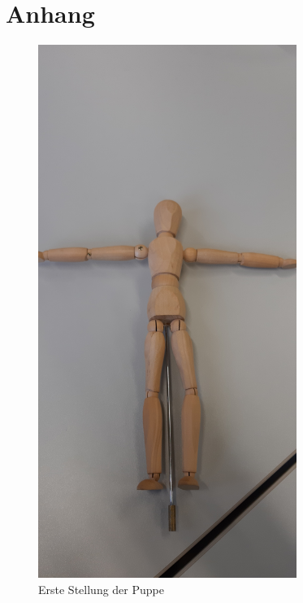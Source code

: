 \section{Anhang}
\label{sec:Anhang}

\begin{figure}
    \centering
    \includegraphics[width=0.75\textwidth, angle=-90]{Bilder/Stellung1.jpg}
    \caption{Erste Stellung der Puppe}
    \label{fig:stellung1}
  \end{figure}
  
